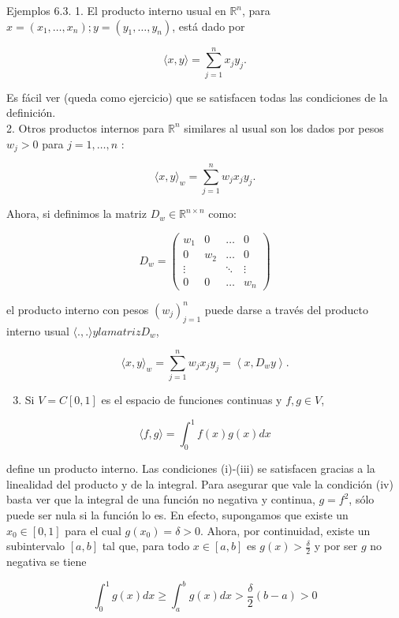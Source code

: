 \documentclass[10pt]{book}
\begin{document}
Ejemplos 6.3. 1. El producto interno usual en $\mathbb{R}^{n}$, para $x=\left(x_{1}, \ldots, x_{n}\right) ; y=\left(y_{1}, \ldots, y_{n}\right)$, está dado por

$$
\langle x, y\rangle=\sum_{j=1}^{n} x_{j} y_{j} .
$$

Es fácil ver (queda como ejercicio) que se satisfacen todas las condiciones de la definición.\\
2. Otros productos internos para $\mathbb{R}^{n}$ similares al usual son los dados por pesos $w_{j}>0$ para $j=1, \ldots, n$ :

$$
\langle x, y\rangle_{w}=\sum_{j=1}^{n} w_{j} x_{j} y_{j} .
$$

Ahora, si definimos la matriz $D_{w} \in \mathbb{R}^{n \times n}$ como:

$$
D_{w}=\left(\begin{array}{cccc}
w_{1} & 0 & \ldots & 0 \\
0 & w_{2} & \ldots & 0 \\
\vdots & & \ddots & \vdots \\
0 & 0 & \ldots & w_{n}
\end{array}\right)
$$

el producto interno con pesos $\left(w_{j}\right)_{j=1}^{n}$ puede darse a través del producto interno usual $\langle.,$.$\rangle y la matriz D_{w}$,

$$
\langle x, y\rangle_{w}=\sum_{j=1}^{n} w_{j} x_{j} y_{j}=\left\langle x, D_{w} y\right\rangle .
$$

\begin{enumerate}
  \setcounter{enumi}{2}
  \item Si $V=C[0,1]$ es el espacio de funciones continuas y $f, g \in V$,
\end{enumerate}

$$
\langle f, g\rangle=\int_{0}^{1} f(x) g(x) d x
$$

define un producto interno. Las condiciones (i)-(iii) se satisfacen gracias a la linealidad del producto y de la integral. Para asegurar que vale la condición (iv) basta ver que la integral de una función no negativa y continua, $g=f^{2}$, sólo puede ser nula si la función lo es. En efecto, supongamos que existe un $x_{0} \in[0,1]$ para el cual $g\left(x_{0}\right)=\delta>0$. Ahora, por continuidad, existe un subintervalo $[a, b]$ tal que, para todo $x \in[a, b]$ es $g(x)>\frac{\delta}{2}$ y por ser $g$ no negativa se tiene

$$
\int_{0}^{1} g(x) d x \geq \int_{a}^{b} g(x) d x>\frac{\delta}{2}(b-a)>0
$$
\end{document}
